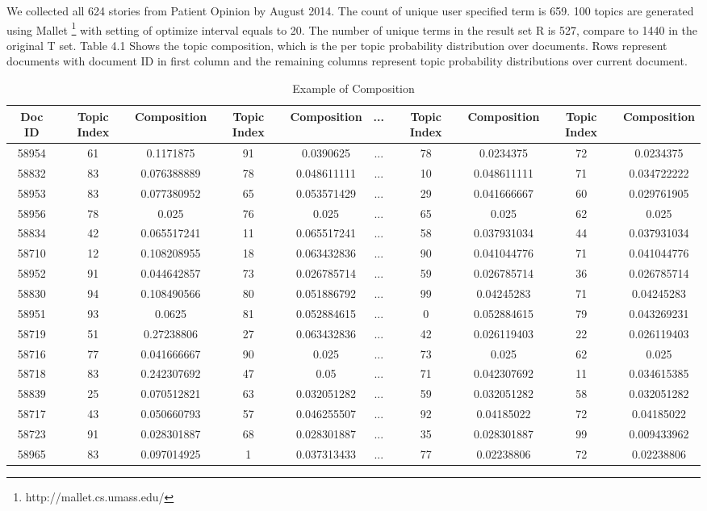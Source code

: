 \documentclass[11pt,twoside]{report}
\begin{document}
We collected all 624 stories from Patient Opinion by August 2014. The count of unique user specified term is 659. 100 topics are generated using Mallet \footnote{http://mallet.cs.umass.edu/} with setting of optimize interval equals to 20.  The number of unique terms in the result set R is 527, compare to 1440 in the original T set. 
Table 4.1 Shows the topic composition, which is the per topic probability distribution over documents. Rows represent documents with document ID in first column and the remaining columns represent topic probability distributions over current document. 
\begin{table}[h]
\tiny
\caption{Example of Composition}
\centering
\begin{tabular}{| c | c | c | c | c | c | c | c | c | c |}
\hline\hline
Doc ID & Topic Index & Composition & Topic Index & Composition & ... & Topic Index & Composition & Topic Index & Composition\\
\hline
58954 & 61 & 0.1171875 & 91 & 0.0390625 &...& 78 & 0.0234375 & 72 & 0.0234375\\
\hline
58832 & 83 & 0.076388889 & 78 & 0.048611111 &...& 10 & 0.048611111 & 71 & 0.034722222\\
\hline
58953 & 83 & 0.077380952 & 65 & 0.053571429 &...& 29 & 0.041666667 & 60 & 0.029761905\\
\hline
58956 & 78 & 0.025 & 76 & 0.025 &...& 65 & 0.025 & 62 & 0.025\\
\hline
58834 & 42 & 0.065517241 & 11 & 0.065517241 &...& 58 & 0.037931034 & 44 & 0.037931034\\
\hline
58710 & 12 & 0.108208955 & 18 & 0.063432836 &...& 90 & 0.041044776 & 71 & 0.041044776\\
\hline
58952 & 91 & 0.044642857 & 73 & 0.026785714 &...& 59 & 0.026785714 & 36 & 0.026785714\\
\hline
58830 & 94 & 0.108490566 & 80 & 0.051886792 &...& 99 & 0.04245283 & 71 & 0.04245283\\
\hline
58951 & 93 & 0.0625 & 81 & 0.052884615 &...& 0 & 0.052884615 & 79 & 0.043269231\\
\hline
58719 & 51 & 0.27238806 & 27 & 0.063432836 &...& 42 & 0.026119403 & 22 & 0.026119403\\
\hline
58716 & 77 & 0.041666667 & 90 & 0.025 &...& 73 & 0.025 & 62 & 0.025\\
\hline
58718 & 83 & 0.242307692 & 47 & 0.05 &...& 71 & 0.042307692 & 11 & 0.034615385\\
\hline
58839 & 25 & 0.070512821 & 63 & 0.032051282 &...& 59 & 0.032051282 & 58 & 0.032051282\\
\hline
58717 & 43 & 0.050660793 & 57 & 0.046255507 &...& 92 & 0.04185022 & 72 & 0.04185022\\
\hline
58723 & 91 & 0.028301887 & 68 & 0.028301887 &...& 35 & 0.028301887 & 99 & 0.009433962\\
\hline
58965 & 83 & 0.097014925 & 1 & 0.037313433 &...& 77 & 0.02238806 & 72 & 0.02238806\\
\hline
\end{tabular}
\label{table:Example of Composition}
\end{table}
\end{document}
